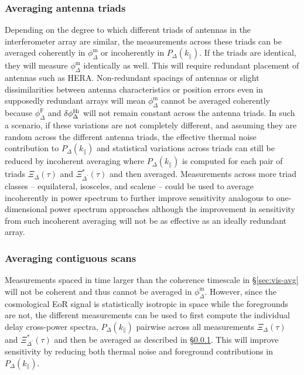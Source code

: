 \documentclass[
reprint,
superscriptaddress,
amsmath,
amssymb,
aps,
prd
]{revtex4-1}
\begin{document}
\subsubsection{Averaging antenna triads}\label{sec:triad-avg}

Depending on the degree to which different triads of antennas in the interferometer array are similar, the measurements across these triads can be averaged coherently in $\phi_\Delta^\textrm{m}$ or incoherently in $P_\Delta(k_\parallel)$. If the triads are identical, they will measure $\phi_\Delta^\textrm{m}$ identically as well. This will require redundant placement of antennas such as HERA. Non-redundant spacings of antennas or slight dissimilarities between antenna characteristics or position errors even in supposedly redundant arrays will mean $\phi_\Delta^\textrm{m}$ cannot be averaged coherently because $\phi_\Delta^\textrm{F}$ and $\delta\phi_\Delta^\textrm{H{\sc i}}$ will not remain constant across the antenna triads. In such a scenario, if these variations are not completely different, and assuming they are random across the different antenna triads, the effective thermal noise contribution to $P_\Delta(k_\parallel)$ and statistical variations across triads can still be reduced by incoherent averaging where $P_\Delta(k_\parallel)$ is computed for each pair of triads $\Xi_\Delta(\tau)$ and $\Xi_{\Delta^\prime}^*(\tau)$ and then averaged. Measurements across more triad classes -- equilateral, isosceles, and scalene -- could be used to average incoherently in power spectrum to further improve sensitivity analogous to one-dimensional power spectrum approaches although the improvement in sensitivity from such incoherent averaging will not be as effective as an ideally redundant array.

\subsubsection{Averaging contiguous scans}\label{sec:utc-avg}

Measurements spaced in time larger than the coherence timescale in \S\ref{sec:vis-avg} will not be coherent and thus cannot be averaged in $\phi_\Delta^\textrm{m}$. However, since the cosmological EoR signal is statistically isotropic in space while the foregrounds are not, the different measurements can be used to first compute the individual delay cross-power spectra, $P_\Delta(k_\parallel)$ pairwise across all measurements $\Xi_\Delta(\tau)$ and $\Xi_{\Delta^\prime}^*(\tau)$ and then be averaged as described in \S\ref{sec:triad-avg}. This will improve sensitivity by reducing both thermal noise and foreground contributions in $P_\Delta(k_\parallel)$. 
\end{document}

